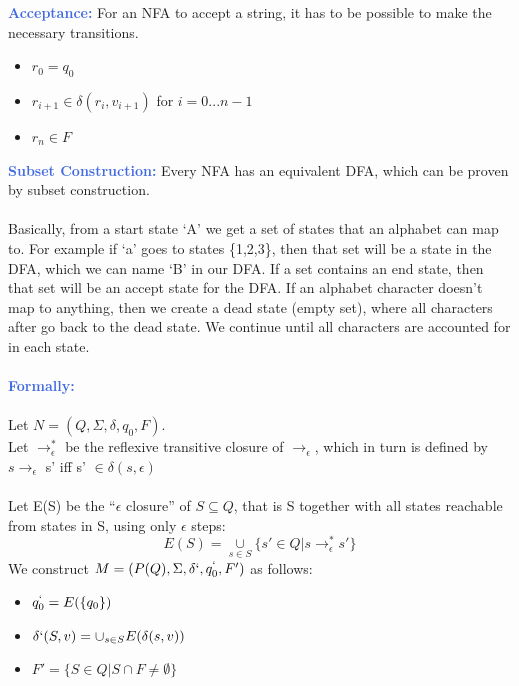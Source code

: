 \documentclass[a4paper,10pt]{article}
\begin{document}
\textcolor{RoyalBlue}{\textbf{Acceptance:}} For an NFA to accept a string, it has to be possible to make the necessary transitions.
\renewcommand{\labelitemi}{\textperiodcentered}
\begin{itemize}
\item $r_{0} = q_{0}$
\item $r_{i+1} \in \delta(r_{i}, v_{i+1})$ for $i=0...n-1$
\item $r_{n} \in F$
\end{itemize}
\textcolor{RoyalBlue}{\textbf{Subset Construction:}} Every NFA has an equivalent DFA, which can be proven by subset construction. \\\\
Basically, from a start state `A' we get a set of states that an alphabet can map to. For example if `a' goes to states \{1,2,3\}, then that set will be a state in the DFA, which we can name `B' in our DFA. If a set contains an end state, then that set will be an accept state for the DFA. If an alphabet character doesn't map to anything, then we create a dead state (empty set), where all characters after go back to the dead state.  We continue until all characters are accounted for in each state. \\\\
\textcolor{RoyalBlue}{\textbf{Formally:}} \\\\ 
Let $N = (Q, \Sigma, \delta, q_{0}, F)$. \\ 
Let $\rightarrow_{\epsilon}^{*}$ be the reflexive transitive closure of $\rightarrow_{\epsilon}$, which in turn is defined by $s \rightarrow_{\epsilon}$ s' iff s' $\in \delta (s, \epsilon)$ \\\\
Let E(S) be the ``$\epsilon$ closure'' of $S \subseteq Q$, that is S together with all states reachable from states in S, using only 
$\epsilon$ steps: \\
\begin{equation*}
E(S) = \underset{s \in S}{\cup} \{s' \in Q | s \rightarrow_{\epsilon}^{*} s'\} 
\end{equation*}
\newline
We construct $M = (P(Q), \Sigma, \delta `, q_{0}^{`}, F')$ as follows: 
\renewcommand{\labelitemi}{\textperiodcentered}
\begin{itemize}
\item $q_{0}^{`} = E(\{q_{0}\})$
\item $\delta ` (S,v) = \cup_{s \in S} E(\delta(s,v))$
\item $F' = \{S \in Q | S \cap F \neq \emptyset \}$ \\
\end{itemize}
\end{document}
